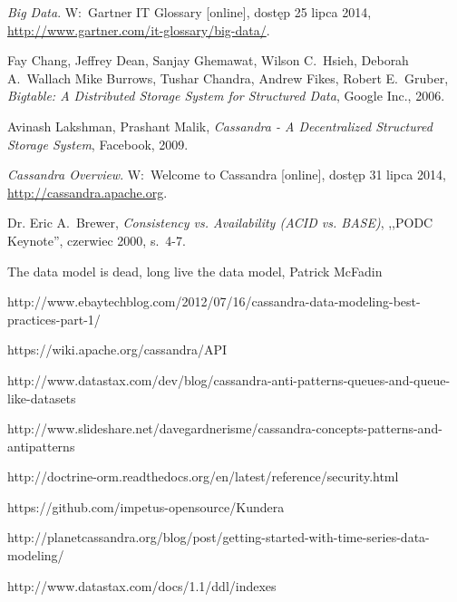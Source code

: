 
\begin{thebibliography}{9}

\emph{Big Data}. W:~Gartner IT Glossary [online], dostęp 25 lipca 2014, \linebreak \url{http://www.gartner.com/it-glossary/big-data/}.

Fay Chang, Jeffrey Dean, Sanjay Ghemawat, Wilson C.~Hsieh, Deborah A.~Wallach Mike Burrows, Tushar Chandra, Andrew Fikes, Robert E.~Gruber, \emph{Bigtable: A Distributed Storage System for Structured Data}, Google Inc., 2006.

Avinash Lakshman, Prashant Malik, \emph{Cassandra - A Decentralized Structured Storage System}, Facebook, 2009.

\emph{Cassandra Overview}. W:~Welcome to Cassandra [online], dostęp 31 lipca 2014, \url{http://cassandra.apache.org}.

Dr. Eric A.~Brewer, \emph{Consistency vs. Availability (ACID vs. BASE)}, ,,PODC Keynote'', czerwiec 2000, s.~4-7.

The data model is dead, long live the data model, Patrick McFadin

http://www.ebaytechblog.com/2012/07/16/cassandra-data-modeling-best-practices-part-1/

https://wiki.apache.org/cassandra/API

http://www.datastax.com/dev/blog/cassandra-anti-patterns-queues-and-queue-like-datasets

http://www.slideshare.net/davegardnerisme/cassandra-concepts-patterns-and-antipatterns

http://doctrine-orm.readthedocs.org/en/latest/reference/security.html

https://github.com/impetus-opensource/Kundera

http://planetcassandra.org/blog/post/getting-started-with-time-series-data-modeling/

http://www.datastax.com/docs/1.1/ddl/indexes


\end{thebibliography}
